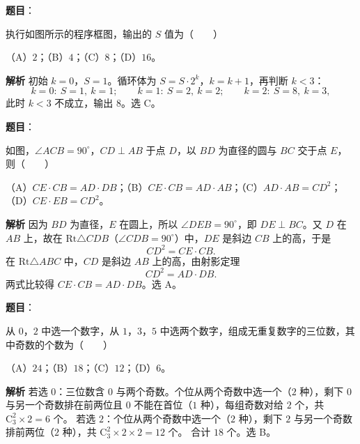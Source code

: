 \begin{answer}

\textbf{题目}：

执行如图所示的程序框图，输出的 $S$ 值为\mbox{（　　）}
\nopagebreak[4]
\begin{center}\end{center}
\nopagebreak[4]
（A）$2$；（B）$4$；（C）$8$；（D）$16$。

\textbf{解析}
初始 $k=0$，$S=1$。循环体为 $S=S\cdot2^k$，$k=k+1$，再判断 $k<3$：
\nopagebreak[4]
\[k=0:\ S=1,\ k=1;\qquad k=1:\ S=2,\ k=2;\qquad k=2:\ S=8,\ k=3,\]
此时 $k<3$ 不成立，输出 $8$。选 C。


\end{answer}
\begin{answer}

\textbf{题目}：

如图，$\angle ACB=90^\circ$，$CD\perp AB$ 于点 $D$，以 $BD$ 为直径的圆与 $BC$ 交于点 $E$，则\mbox{（　　）}
\nopagebreak[4]
\begin{center}\end{center}
\nopagebreak[4]
（A）$CE\cdot CB=AD\cdot DB$；（B）$CE\cdot CB=AD\cdot AB$；（C）$AD\cdot AB=CD^2$；（D）$CE\cdot EB=CD^2$。

\textbf{解析}
因为 $BD$ 为直径，$E$ 在圆上，所以 $\angle DEB=90^\circ$，即 $DE\perp BC$。又 $D$ 在 $AB$ 上，故在 $\mathrm{Rt}\triangle CDB$（$\angle CDB=90^\circ$）中，$DE$ 是斜边 $CB$ 上的高，于是
\nopagebreak[4]
\[CD^2=CE\cdot CB.\]
在 $\mathrm{Rt}\triangle ABC$ 中，$CD$ 是斜边 $AB$ 上的高，由射影定理
\nopagebreak[4]
\[CD^2=AD\cdot DB.\]
两式比较得 $CE\cdot CB=AD\cdot DB$。选 A。


\end{answer}
\begin{answer}

\textbf{题目}：

从 $0$，$2$ 中选一个数字，从 $1$，$3$，$5$ 中选两个数字，组成无重复数字的三位数，其中奇数的个数为\mbox{（　　）}

（A）$24$；（B）$18$；（C）$12$；（D）$6$。

\textbf{解析}
若选 $0$：三位数含 $0$ 与两个奇数。个位从两个奇数中选一个（$2$ 种），剩下 $0$ 与另一个奇数排在前两位且 $0$ 不能在首位（$1$ 种），每组奇数对给 $2$ 个，共 $\mathrm C_3^2\times2=6$ 个。
若选 $2$：个位从两个奇数中选一个（$2$ 种），剩下 $2$ 与另一个奇数排前两位（$2$ 种），共 $\mathrm C_3^2\times2\times2=12$ 个。
合计 $18$ 个。选 B。


\end{answer}
